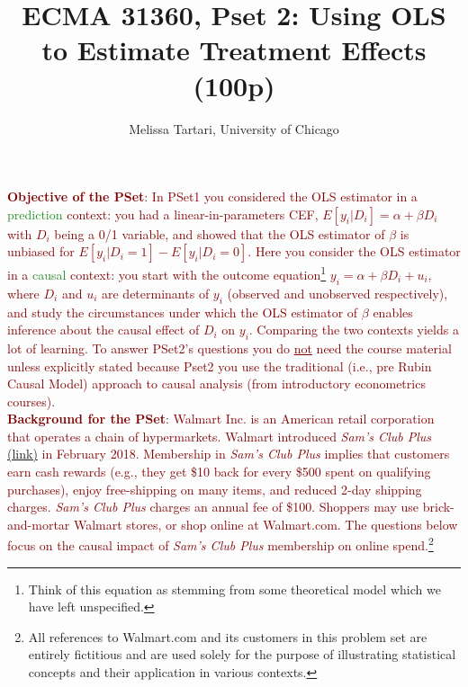 \documentclass{article}
\begin{document}
\title{ECMA 31360, Pset 2: Using OLS to Estimate Treatment Effects (100p)}
\date{}
\author{Melissa Tartari, University of Chicago}
\maketitle
\thispagestyle{fancy}



\noindent \textcolor{Maroon}{\textbf{Objective of the PSet}: In PSet1 you considered the OLS estimator in a \textcolor{ForestGreen}{prediction} context: you had a linear-in-parameters CEF, $E[y_i|D_i]=\alpha+\beta D_i$ with $D_i$ being a 0/1 variable, and showed that the OLS estimator of $\beta$ is unbiased for $E[y_i|D_i=1]-E[y_i|D_i=0]$. Here you consider the OLS estimator in a \textcolor{ForestGreen}{causal} context: you start with the outcome equation\footnote{Think of this equation as stemming from some theoretical model which we have left unspecified.} $y_i=\alpha+\beta D_i + u_i$, where $D_i$ and $u_i$ are determinants of $y_i$ (observed and unobserved respectively), and study the circumstances under which the OLS estimator of $\beta$ enables inference about the causal effect of $D_i$ on $y_i$. Comparing the two contexts yields a lot of learning. To answer PSet2's questions you do \underline{not} need the course material unless explicitly stated because Pset2 you use the traditional (i.e., pre Rubin Causal Model) approach to causal analysis (from introductory econometrics courses).}\\

\noindent \textcolor{Maroon}{\textbf{Background for the PSet}: Walmart Inc. is an American retail corporation that operates a chain of hypermarkets. Walmart introduced \textit{Sam's Club Plus} \href{https://www.samsclub.com/sams/pagedetails/content.jsp?pageName=aboutSams&xid=hpg_member_3}{(link)} in February 2018. Membership in \textit{Sam's Club Plus} implies that customers earn cash rewards (e.g., they get \$10 back for every \$500 spent on qualifying purchases), enjoy free-shipping on many items, and reduced 2-day shipping charges. \textit{Sam's Club Plus} charges an annual fee of \$100. Shoppers may use brick-and-mortar Walmart stores, or shop online at Walmart.com. The questions below focus on the causal impact of \textit{Sam's Club Plus} membership on online spend.}\footnote{All references to Walmart.com and its customers in this problem set are entirely fictitious and are used solely for the purpose of illustrating
statistical concepts and their application in various contexts.}  
\end{document}
